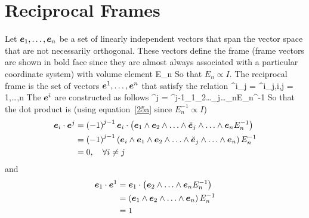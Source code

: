 \section{Reciprocal Frames}
Let ${\bm{e}_{1}},\dots,{\bm{e}_{n}}$ be a set of linearly independent vectors that span the vector space that are
not necessarily orthogonal. These vectors define the frame (frame vectors are shown in bold face since they are almost always associated with a particular coordinate system) with volume element
\be
	E_{n} \equiv {}
\ee
So that $E_{n} \propto I$.  The reciprocal frame is the set of vectors ${\bm{e}^{1}},\dots,{\bm{e}^{n}}$ that satisfy the relation
\be
	\eb^{i}\cdot \eb_{j} = \delta^{i}_{j},\quad \forall i,j = 1,\dots,n
\ee
The $\bm{e}^{i}$ are constructed as follows
\be\label{eq61}
	\eb^{j} = ^{j-1}\eb_{1}\w\eb_{2}\w\dots\w\breve{\eb}_{j}\w\dots\w\eb_{n}E_{n}^{-1}
\ee
So that the dot product is (using equation~\ref{25a} since $E_{n}^{-1} \propto I$)
\begin{align}
	\eb_{i}\cdot\eb^{j} &= \paren{-1}^{j-1}\eb_{i}\cdot\paren{\eb_{1}\w\eb_{2}\w\dots\w\breve{\eb}_{j}
							\w\dots\w\eb_{n}E_{n}^{-1}} \\
 						&= \paren{-1}^{j-1}\paren{\eb_{i}\w\eb_{1}\w\eb_{2}\w\dots\w\breve{\eb}_{j}
							\w\dots\w\eb_{n}}E_{n}^{-1} \\
						&= 0,\quad\forall i \ne j
\end{align}
and
\begin{align}
	\eb_{1}\cdot\eb^{1} & = \eb_{1}\cdot\paren{\wprod{\eb_{2}}{\eb_{n}}E_{n}^{-1}} \\
						& = \paren{\eb_{1}\w\wprod{\eb_{2}}{\eb_{n}}}E_{n}^{-1} \\
						& = 1 
\end{align}
